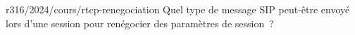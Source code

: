 \begin{question}{r316/2024/cours/rtcp-renegociation}
  Quel type de message SIP peut-être envoyé lors d'une session pour
  renégocier des paramètres de session~?
  \begin{reponses}[3]
  \end{reponses}
\end{question}
